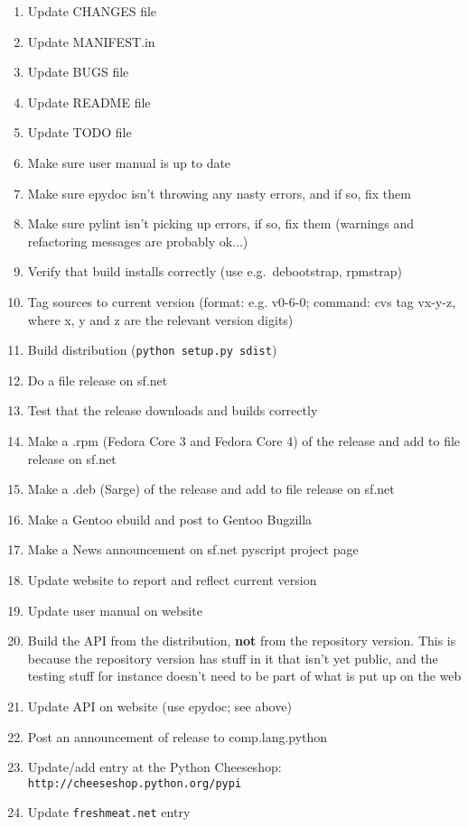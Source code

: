 \documentclass[12pt,a4paper]{article}
\begin{document}
\begin{enumerate}
\item Update CHANGES file
\item Update MANIFEST.in
\item Update BUGS file
\item Update README file
\item Update TODO file
\item Make sure user manual is up to date
\item Make sure epydoc isn't throwing any nasty errors, and if so, fix them
\item Make sure pylint isn't picking up errors, if so, fix them (warnings
and refactoring messages are probably ok...)
\item Verify that build installs correctly (use e.g.~debootstrap, rpmstrap)
\item Tag sources to current version (format: e.g. v0-6-0; command: cvs tag
vx-y-z, where x, y and z are the relevant version digits)
\item Build distribution (\texttt{python setup.py sdist})
\item Do a file release on sf.net
\item Test that the release downloads and builds correctly
\item Make a .rpm (Fedora Core 3 and Fedora Core 4) of the release and 
add to file release on sf.net
\item Make a .deb (Sarge) of the release and add to file release on sf.net
\item Make a Gentoo ebuild and post to Gentoo Bugzilla
\item Make a News announcement on sf.net pyscript project page
\item Update website to report and reflect current version
\item Update user manual on website
\item Build the API from the distribution, \textbf{not} from the repository 
version.  This is because the repository version has stuff in it that isn't
yet public, and the testing stuff for instance doesn't need to be part of
what is put up on the web
\item Update API on website (use epydoc; see above)
\item Post an announcement of release to comp.lang.python
\item Update/add entry at the Python Cheeseshop:
\texttt{http://cheeseshop.python.org/pypi}
\item Update \texttt{freshmeat.net} entry
\end{enumerate}
\end{document}
